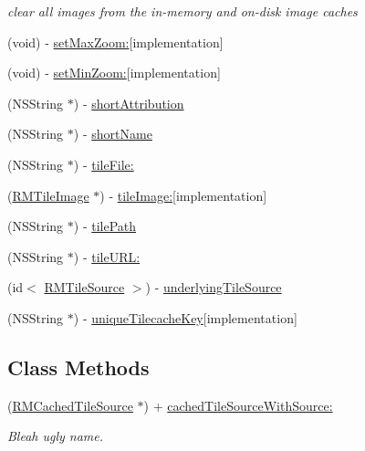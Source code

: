 \begin{DoxyCompactItemize}
\begin{DoxyCompactList}\small\item\em clear all images from the in-\/memory and on-\/disk image caches \end{DoxyCompactList}\item 
(void) -\/ \hyperlink{interface_r_m_cached_tile_source_abfc94f15a69698f3ff8c127a66bda7a4}{set\-Max\-Zoom\-:}{\ttfamily  \mbox{[}implementation\mbox{]}}
\item 
(void) -\/ \hyperlink{interface_r_m_cached_tile_source_af62c9fa10f55febeef1054ae644cc045}{set\-Min\-Zoom\-:}{\ttfamily  \mbox{[}implementation\mbox{]}}
\item 
(N\-S\-String $\ast$) -\/ \hyperlink{interface_r_m_cached_tile_source_addd642460ef82b300d67d60813d6338d}{short\-Attribution}
\item 
(N\-S\-String $\ast$) -\/ \hyperlink{interface_r_m_cached_tile_source_a70953c71ca922e6dd6093a94723efbb5}{short\-Name}
\item 
(N\-S\-String $\ast$) -\/ \hyperlink{interface_r_m_cached_tile_source_a4a4b44c6e1899ad11e9a72e21502861a}{tile\-File\-:}
\item 
(\hyperlink{interface_r_m_tile_image}{R\-M\-Tile\-Image} $\ast$) -\/ \hyperlink{interface_r_m_cached_tile_source_a21743e9d45e9ce2accf27dd098e1b2f0}{tile\-Image\-:}{\ttfamily  \mbox{[}implementation\mbox{]}}
\item 
(N\-S\-String $\ast$) -\/ \hyperlink{interface_r_m_cached_tile_source_a49619cfba67b331c19bdab55cfe3475f}{tile\-Path}
\item 
(N\-S\-String $\ast$) -\/ \hyperlink{interface_r_m_cached_tile_source_a96037f61390856cb9dda7e955ff1f551}{tile\-U\-R\-L\-:}
\item 
(id$<$ \hyperlink{protocol_r_m_tile_source-p}{R\-M\-Tile\-Source} $>$) -\/ \hyperlink{interface_r_m_cached_tile_source_a07fd06ac405d532aba3653e965b279a1}{underlying\-Tile\-Source}
\item 
(N\-S\-String $\ast$) -\/ \hyperlink{interface_r_m_cached_tile_source_aa6226fe9784e2f6b47b45ea24d7c062f}{unique\-Tilecache\-Key}{\ttfamily  \mbox{[}implementation\mbox{]}}
\end{DoxyCompactItemize}
\subsection*{Class Methods}
\begin{DoxyCompactItemize}
\item 
(\hyperlink{interface_r_m_cached_tile_source}{R\-M\-Cached\-Tile\-Source} $\ast$) + \hyperlink{interface_r_m_cached_tile_source_a3ae5adfa3d611c7fef0080813e9cf766}{cached\-Tile\-Source\-With\-Source\-:}
\begin{DoxyCompactList}\small\item\em Bleah ugly name. \end{DoxyCompactList}\end{DoxyCompactItemize}
